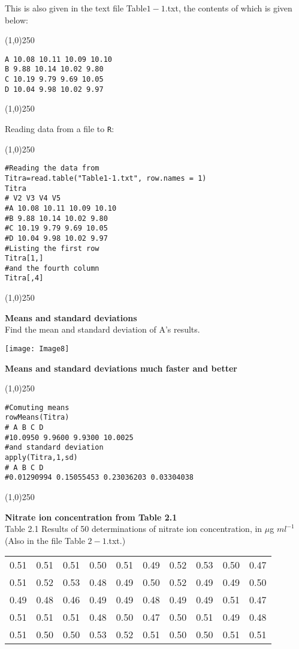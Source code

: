 This is also given in the text file Table$1-1$.txt, the contents of which is given below:
\begin{center}
	\line(1,0){250}
\end{center}
\begin{verbatim}
A 10.08 10.11 10.09 10.10
B 9.88 10.14 10.02 9.80
C 10.19 9.79 9.69 10.05
D 10.04 9.98 10.02 9.97
\end{verbatim}
\begin{center}
	\line(1,0){250}
\end{center}

Reading data from a file to \texttt{R}:
\begin{center}
	\line(1,0){250}
\end{center}
\begin{verbatim}
#Reading the data from
Titra=read.table("Table1-1.txt", row.names = 1)
Titra
# V2 V3 V4 V5
#A 10.08 10.11 10.09 10.10
#B 9.88 10.14 10.02 9.80
#C 10.19 9.79 9.69 10.05
#D 10.04 9.98 10.02 9.97
#Listing the first row
Titra[1,]
#and the fourth column
Titra[,4]
\end{verbatim}
\begin{center}
	\line(1,0){250}
\end{center}

\textbf{Means and standard deviations}\\

Find the mean and standard deviation of A's results.

\begin{center}
	\texttt{[image: Image8]}
\end{center}


\textbf{Means and standard deviations much faster and better}
\begin{center}
	\line(1,0){250}
\end{center}
\begin{verbatim}
#Comuting means
rowMeans(Titra)
# A B C D
#10.0950 9.9600 9.9300 10.0025
#and standard deviation
apply(Titra,1,sd)
# A B C D
#0.01290994 0.15055453 0.23036203 0.03304038
\end{verbatim}
\begin{center}
	\line(1,0){250}
\end{center}
\newpage
\textbf{Nitrate ion concentration from Table 2.1}\\
Table 2.1 Results of 50 determinations of nitrate ion concentration, in $\mu$g $ml^{-1}$ (Also in the file Table $2-1$.txt.) \\
\begin{tabular}{|c|c|c|c|c|c|c|c|c|c|}
	\hline
	0.51 &0.51 &0.51 &0.50 &0.51 &0.49 &0.52 &0.53 &0.50 &0.47\\
	0.51 &0.52 &0.53 &0.48 &0.49 &0.50 &0.52 &0.49 &0.49 &0.50\\
	0.49 &0.48 &0.46 &0.49 &0.49 &0.48 &0.49 &0.49 &0.51 &0.47\\
	0.51 &0.51 &0.51 &0.48 &0.50 &0.47 &0.50 &0.51 &0.49 &0.48\\
	0.51 &0.50 &0.50 &0.53 &0.52 &0.51 &0.50 &0.50 &0.51 &0.51\\
	\hline
\end{tabular}\\ \bigskip

